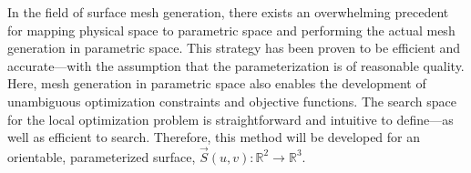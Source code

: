 In the field of surface mesh generation, there exists an overwhelming
precedent for mapping physical space to parametric space and performing
the actual mesh generation in parametric space. This strategy has
been proven to be efficient and accurate---with the assumption that the
parameterization is of reasonable quality. Here, mesh generation in
parametric space also enables the development of unambiguous
optimization constraints and objective functions. The search space for
the local optimization problem is straightforward and intuitive to
define---as well as efficient to search. Therefore, this method will be
developed for an orientable, parameterized surface,
$\vec{S}\left(u,v\right) : {\mathbb R}^2 \rightarrow {\mathbb R}^3$.

